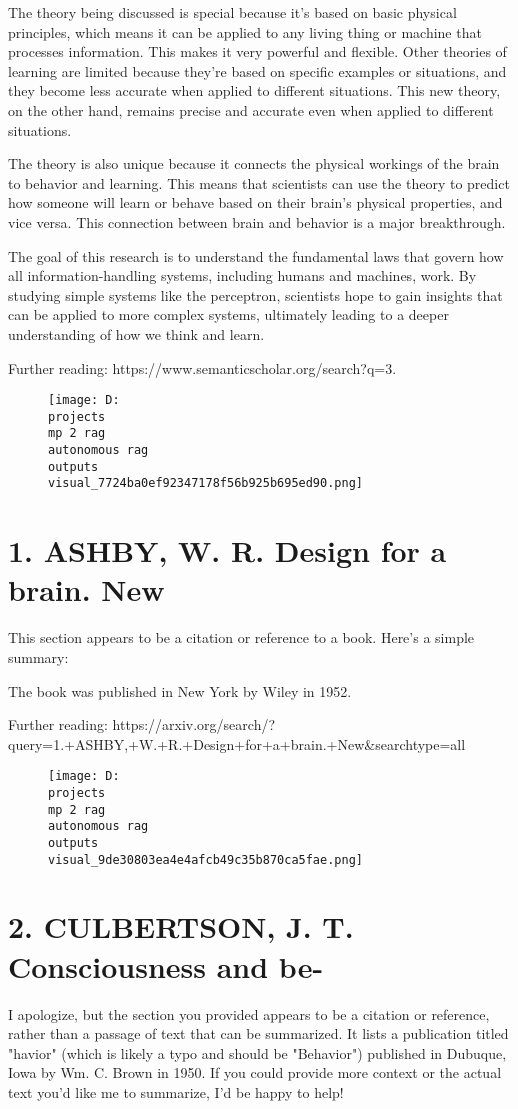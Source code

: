 \documentclass[12pt,a4paper]{article}
\begin{document}
The theory being discussed is special because it's based on basic physical principles, which means it can be applied to any living thing or machine that processes information. This makes it very powerful and flexible. Other theories of learning are limited because they're based on specific examples or situations, and they become less accurate when applied to different situations. This new theory, on the other hand, remains precise and accurate even when applied to different situations.

The theory is also unique because it connects the physical workings of the brain to behavior and learning. This means that scientists can use the theory to predict how someone will learn or behave based on their brain's physical properties, and vice versa. This connection between brain and behavior is a major breakthrough.

The goal of this research is to understand the fundamental laws that govern how all information-handling systems, including humans and machines, work. By studying simple systems like the perceptron, scientists hope to gain insights that can be applied to more complex systems, ultimately leading to a deeper understanding of how we think and learn.

Further reading: https://www.semanticscholar.org/search?q=3.%
\begin{figure}[h]
\centering
\texttt{[image: D:\\projects\\mp 2 rag\\autonomous rag\\outputs\\visual\_7724ba0ef92347178f56b925b695ed90.png]}
\end{figure}
\section{1. ASHBY, W. R. Design for a brain. New}
This section appears to be a citation or reference to a book. Here's a simple summary:

The book was published in New York by Wiley in 1952.

Further reading: https://arxiv.org/search/?query=1.+ASHBY,+W.+R.+Design+for+a+brain.+New&searchtype=all
\begin{figure}[h]
\centering
\texttt{[image: D:\\projects\\mp 2 rag\\autonomous rag\\outputs\\visual\_9de30803ea4e4afcb49c35b870ca5fae.png]}
\end{figure}
\section{2. CULBERTSON, J. T. Consciousness and be-}
I apologize, but the section you provided appears to be a citation or reference, rather than a passage of text that can be summarized. It lists a publication titled "havior" (which is likely a typo and should be "Behavior") published in Dubuque, Iowa by Wm. C. Brown in 1950. If you could provide more context or the actual text you'd like me to summarize, I'd be happy to help!
\end{document}
